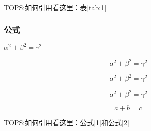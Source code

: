 TOPS:如何引用看这里：表\ref{tab:1}

\subsubsection{公式}

$\alpha^2+\beta^2=\gamma^2$

$$ \alpha^2+\beta^2=\gamma^2$$

\begin{equation}\nonumber
	\alpha^2+\beta^2=\gamma^2
\end{equation}

\begin{equation}
	\alpha^2+\beta^2=\gamma^2 \label{1}
\end{equation}

\begin{equation}
	a+b=c \label{2}
\end{equation}

TOPS:如何引用看这里：公式\eqref{1}和公式\eqref{2}